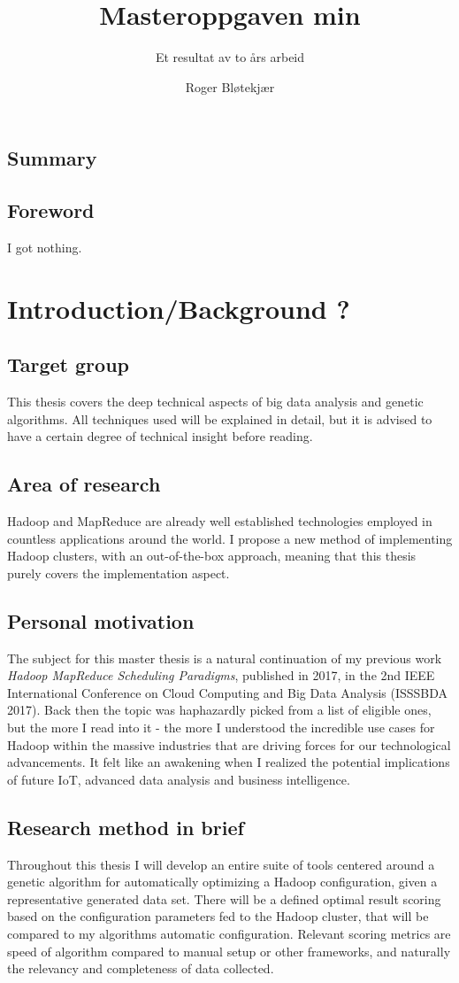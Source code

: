 \documentclass[a4paper,english]{report}
\title{Masteroppgaven min}
\subtitle{Et resultat av to års arbeid}
\author{Roger Bløtekjær}
\begin{document}
	\duoforside[dept={Institutt for informatikk},
	program={Informatikk: språkteknologi},
	short]
	\section{Summary}
	\section{Foreword}
	I got nothing.
	\tableofcontents
	\chapter{Introduction/Background ?}
		\section{Target group}
		This thesis covers the deep technical aspects of big data analysis and genetic algorithms. All techniques used will be explained in detail, but it is advised to have a certain degree of technical insight before reading.
		\section{Area of research}
		Hadoop and MapReduce are already well established technologies employed in countless applications around the world. I propose a new method of implementing Hadoop clusters, with an out-of-the-box approach, meaning that this thesis purely covers the implementation aspect.
		\section{Personal motivation}
		The subject for this master thesis is a natural continuation of my previous work \emph{Hadoop MapReduce Scheduling Paradigms}, published in 2017, in the 2nd IEEE International Conference on Cloud Computing and Big Data Analysis (ISSSBDA 2017). Back then the topic was haphazardly picked from a list of eligible ones, but the more I read into it - the more I understood the incredible use cases for Hadoop within the massive industries that are driving forces for our technological advancements. It felt like an awakening when I realized the potential implications of future IoT, advanced data analysis and business intelligence.
		\section{Research method in brief}
		Throughout this thesis I will develop an entire suite of tools centered around a genetic algorithm for automatically optimizing a Hadoop configuration, given a representative generated data set. There will be a defined optimal result scoring based on the configuration parameters fed to the Hadoop cluster, that will be compared to my algorithms automatic configuration. Relevant scoring metrics are speed of algorithm compared to manual setup or other frameworks, and naturally the relevancy and completeness of data collected.
\end{document}
